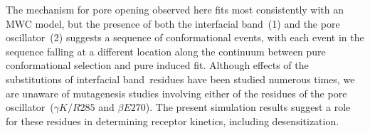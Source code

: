 \documentclass[journal=jacsat,manuscript=article]{achemso}
\newcommand{\fivering}{interfacial band~}
\newcommand{\triad}{pore oscillator~}
\begin{document}
 The mechanism for pore opening observed here fits most consistently with an MWC model, but %
the presence of both the \fivering (1) and the \triad (2) suggests a sequence of conformational events, with each event in the sequence falling at a different location along the continuum between pure conformational selection and pure induced fit.  Although effects of the substitutions of  \fivering residues have been studied numerous times, we are unaware of mutagenesis studies involving either of the residues of the \triad ($\gamma K/R285$ and $\beta E270$).  The present simulation results suggest a role for these residues in determining receptor kinetics, including desensitization. 


\end{document}
